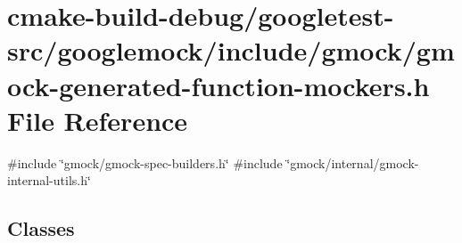\hypertarget{gmock-generated-function-mockers_8h}{}\section{cmake-\/build-\/debug/googletest-\/src/googlemock/include/gmock/gmock-\/generated-\/function-\/mockers.h File Reference}
\label{gmock-generated-function-mockers_8h}
{\ttfamily \#include \char`\"{}gmock/gmock-\/spec-\/builders.\+h\char`\"{}}\newline
{\ttfamily \#include \char`\"{}gmock/internal/gmock-\/internal-\/utils.\+h\char`\"{}}\newline
\subsection*{Classes}
